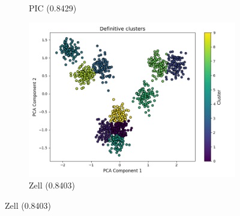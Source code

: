 \documentclass[
	10pt,
	parskip=half-,	
	paper=a4,
	english
	]{scrartcl}
\begin{document}
\begin{figure}[ht]
\begin{subfigure}[b]{0.3\textwidth}
        \caption{PIC (0.8429)}
    \end{subfigure}
    \begin{subfigure}[b]{0.3\textwidth}
        \includegraphics[width=\textwidth]{../data/plots/synthetic_noise_blobs_blobs_Zell_structural_0.png}
        \caption{Zell (0.8403)}
    \end{subfigure}
    
    \vspace{0.3cm}
    

\end{figure}
\end{document}
